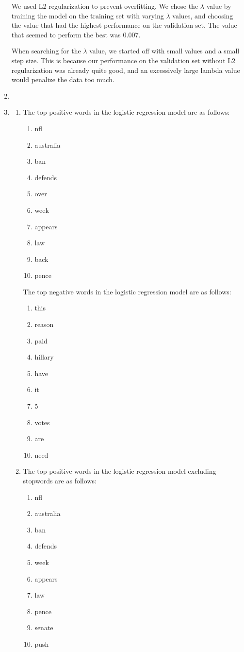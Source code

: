 \documentclass[10pt,letterpaper]{article}
\begin{document}
\begin{enumerate}
	We used L2 regularization to prevent overfitting.
	We chose the $\lambda$ value by training the model on the training set with varying $\lambda$ values, and choosing the value that had the highest performance on the validation set.
	The value that seemed to perform the best was 0.007.
	
	When searching for the $\lambda$ value, we started off with small values and a small step size.
	This is because our performance on the validation set without L2 regularization was already quite good, and an excessively large lambda value would penalize the data too much.
	
	\item %
	\item %
	\begin{enumerate}
		\item %
		The top positive words in the logistic regression model are as follows:
		\begin{enumerate}
			\item nfl
			\item australia
			\item ban
			\item defends
			\item over
			\item week
			\item appears
			\item law
			\item back
			\item pence
		\end{enumerate}
		
		The top negative words in the logistic regression model are as follows:
		\begin{enumerate}
			\item this
			\item reason
			\item paid
			\item hillary
			\item have
			\item it
			\item 5
			\item votes
			\item are
			\item need
		\end{enumerate}
		\item %
		The top positive words in the logistic regression model excluding stopwords are as follows:
		\begin{enumerate}
			\item nfl
			\item australia
			\item ban
			\item defends
			\item week
			\item appears
			\item law
			\item pence
			\item senate
			\item push
		\end{enumerate}
		

\end{enumerate}
\end{enumerate}
\end{document}
